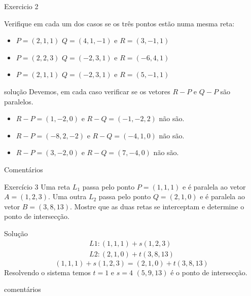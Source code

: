 \documentclass{beamer}
\begin{document}
\begin{frame}{Exercicio 2}

Verifique em cada um dos casos se os três pontos estão numa mesma reta:
\begin{itemize}
    \item $P=(2,1,1)$ $Q=(4,1,-1)$ e $R=(3,-1,1)$
    \item $P=(2,2,3)$ $Q=(-2,3,1)$ e $R=(-6,4,1)$
    \item $P=(2,1,1)$ $Q=(-2,3,1)$ e $R=(5,-1,1)$
\end{itemize}

\end{frame}

\begin{frame}{solução}
  Devemos, em cada caso verificar se os vetores $R-P$ e $Q-P$ são paralelos.
  \begin{itemize}
    \item $R-P =(1,-2,0)$ e $R-Q=(-1,-2,2)$ não são.
    \item $R-P =(-8,2,-2)$ e $R-Q=(-4,1,0)$ não são.
    \item $R-P =(3,-2,0)$ e $R-Q=(7,-4,0)$ não são.
  \end{itemize}
\end{frame}

\begin{frame}{Comentários}

  
\end{frame}


\begin{frame}{Exercício 3}
   Uma reta $L_1$ passa pelo ponto $P=(1,1,1)$ e é paralela ao vetor $A=(1,2,3).$ Uma outra $L_2$ passa pelo ponto $Q=(2,1,0)$ e é paralela ao vetor $B=(3,8,13).$  Mostre que as duas retas se interceptam e determine o ponto de intersecção.
\end{frame}

\begin{frame}{Solução}
  \begin{gather*}
    L1: (1,1,1) + s(1,2,3) \\
    L2: (2,1,0) + t(3,8,13)
  \end{gather*}
$$(1,1,1) + s(1,2,3)= (2,1,0) + t(3,8,13)$$
  Resolvendo o sistema temos 
  $t=1$ e $s=4$
  $(5,9,13)$ é o ponto de intersecção.

\end{frame}

\begin{frame}{comentários}
  
\end{frame}
\end{document}
